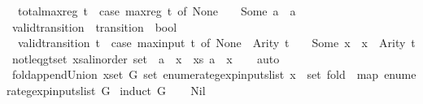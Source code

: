 \begin{isabellebody}
\ \ {\isachardoublequoteopen}total{\isacharunderscore}max{\isacharunderscore}reg\ t\ {\isacharequal}\ {\isacharparenleft}case\ max{\isacharunderscore}reg\ t\ of\ None\ {\isasymRightarrow}\ {}\ {\isacharbar}\ Some\ a\ {\isasymRightarrow}\ a{\isacharparenright}{\isachardoublequoteclose}\isanewline
\isanewline
{}\isamarkupfalse%
\ valid{\isacharunderscore}transition\ {\isacharcolon}{\isacharcolon}\ {\isachardoublequoteopen}transition\ {\isasymRightarrow}\ bool{\isachardoublequoteclose}\ \isanewline
\ \ {\isachardoublequoteopen}valid{\isacharunderscore}transition\ t\ {\isacharequal}\ {\isacharparenleft}case\ max{\isacharunderscore}input\ t\ of\ None\ {\isasymRightarrow}\ Arity\ t\ {\isacharequal}\ {}\ {\isacharbar}\ Some\ x\ {\isasymRightarrow}\ x\ {\isacharless}\ Arity\ t{\isacharparenright}{\isachardoublequoteclose}\isanewline
\isanewline
{}\isamarkupfalse%
\ not{\isacharunderscore}leq{\isacharunderscore}gt{\isacharunderscore}set{\isacharcolon}\ {\isachardoublequoteopen}{\isacharparenleft}{\isasymforall}x{\isasymin}{\isacharparenleft}s{\isacharcolon}{\isacharcolon}{\isacharparenleft}{\isacharprime}a{\isacharcolon}{\isacharcolon}linorder{\isacharparenright}\ set{\isacharparenright}{\isachardot}\ {\isasymnot}\ a\ {\isasymle}\ x{\isacharparenright}\ {\isacharequal}\ {\isacharparenleft}{\isasymforall}x{\isasymin}s{\isachardot}\ a\ {\isachargreater}\ x{\isacharparenright}{\isachardoublequoteclose}\isanewline
%
\isadelimproof
\ \ %
\endisadelimproof
%
\isatagproof
{}\isamarkupfalse%
\ auto%
\endisatagproof
{\isafoldproof}%
%
\isadelimproof
\isanewline
%
\endisadelimproof
\isanewline
{}\isamarkupfalse%
\ fold{\isacharunderscore}append{\isacharunderscore}Union{\isacharcolon}\ {\isachardoublequoteopen}{\isacharparenleft}{\isasymUnion}x{\isasymin}set\ G{\isachardot}\ set\ {\isacharparenleft}enumerate{\isacharunderscore}gexp{\isacharunderscore}inputs{\isacharunderscore}list\ x{\isacharparenright}{\isacharparenright}\ {\isacharequal}\ set\ {\isacharparenleft}fold\ {\isacharparenleft}{\isacharat}{\isacharparenright}\ {\isacharparenleft}map\ enumerate{\isacharunderscore}gexp{\isacharunderscore}inputs{\isacharunderscore}list\ G{\isacharparenright}\ {\isacharbrackleft}{\isacharbrackright}{\isacharparenright}{\isachardoublequoteclose}\isanewline
%
\isadelimproof
%
\endisadelimproof
%
\isatagproof
{}\isamarkupfalse%
{\isacharparenleft}induct\ G{\isacharparenright}\isanewline
\ \ \isamarkupfalse%
\ Nil\isanewline
\ \ \isamarkupfalse%

\end{isabellebody}
